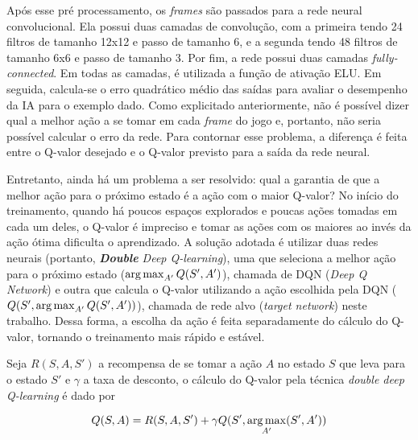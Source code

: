Após esse pré processamento, os \textit{frames} são passados para a rede neural convolucional. Ela possui duas camadas de convolução, com a primeira tendo 24 filtros de tamanho 12x12 e passo de tamanho 6, e a segunda tendo 48 filtros de tamanho 6x6 e passo de tamanho 3.
Por fim, a rede possui duas camadas \textit{fully-connected}.
Em todas as camadas, é utilizada a função de ativação ELU.
Em seguida, calcula-se o erro quadrático médio das saídas para avaliar o desempenho da IA para o exemplo dado.
Como explicitado anteriormente, não é possível dizer qual a melhor ação a se tomar em cada \textit{frame} do jogo e, portanto, não seria possível calcular o erro da rede.
Para contornar esse problema, a diferença é feita entre o Q-valor desejado
e o Q-valor previsto para a saída da rede neural.

Entretanto, ainda há um problema a ser resolvido: qual a garantia de que a melhor ação para o próximo estado é a ação com o maior Q-valor?
No início do treinamento, quando há poucos espaços explorados e poucas ações tomadas em cada um deles, o Q-valor é impreciso e tomar as ações com os maiores ao invés da ação ótima dificulta o aprendizado.
A solução adotada é utilizar duas redes neurais (portanto, \textit{\textbf{Double} Deep Q-learning}), uma que seleciona a melhor ação para o próximo estado ($\operatorname*{arg\,max}_{A'}Q(S',A')$), chamada de DQN (\textit{Deep Q Network}) e outra que calcula o Q-valor utilizando a ação escolhida pela DQN ($Q(S', \operatorname*{arg\,max}_{A'}Q(S',A'))$), chamada de rede alvo (\textit{target network}) neste trabalho. Dessa forma, a escolha da ação é feita separadamente do cálculo do Q-valor, tornando o treinamento mais rápido e estável.

Seja $R(S,A,S')$ a recompensa de se tomar a ação $A$ no estado $S$ que leva para o estado $S'$ e $\gamma$ a taxa de desconto, o cálculo do Q-valor pela técnica \textit{double deep Q-learning} é dado por

\begin{equation} \label{eq:doubledqn}
Q(S,A) = R(S,A,S') + \gamma Q(S', \operatorname*{arg\,max}_{A'}(S',A'))
\end{equation}

